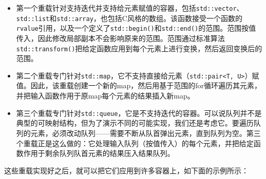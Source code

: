 \begin{itemize}
\item 第一个重载针对支持迭代并支持给元素赋值的容器，包括\texttt{std::\allowbreak{}vector}、\texttt{std::\allowbreak{}list}和\texttt{std::\allowbreak{}array}，也包括C风格的数组。该函数接受一个函数的\texttt{rvalue}引用，以及一个定义了\texttt{std::\allowbreak{}begin()}和\texttt{std::\allowbreak{}end()}的范围。范围按值传入，因此修改局部副本不会影响原来的范围。范围通过标准算法\texttt{std::\allowbreak{}transform()}把给定函数应用到每个元素上进行变换，然后返回变换后的范围。



\item 第二个重载专门针对\texttt{std::\allowbreak{}map}，它不支持直接给元素（\texttt{std::\allowbreak{}pair<\allowbreak{}T, U>}）赋值。因此，该重载创建一个新的map，然后用基于范围的for循环遍历其元素，并把输入函数作用于原map每个元素的结果插入新map。



\item 第三个重载专门针对\texttt{std::\allowbreak{}queue}，它是不支持迭代的容器。可以说队列并不是典型的可映射结构，但为了演示不同的可能实现，我们还是考虑它。要遍历队列的元素，必须改动队列——需要不断从队首弹出元素，直到队列为空。第三个重载正是这么做的：它处理输入队列（按值传入）的每个元素，并把给定函数作用于剩余队列队首元素的结果压入结果队列。

\end{itemize}



这些重载实现好之后，就可以把它们应用到许多容器上，如下面的示例所示：



